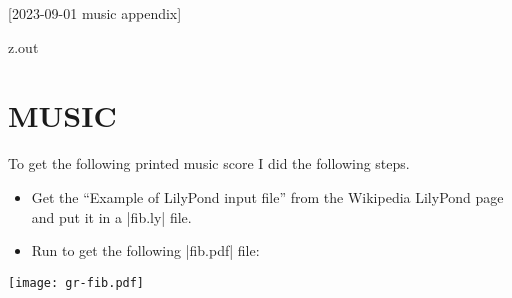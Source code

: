 [2023-09-01 music appendix]

\begin{VerbatimOut}{z.out}
\chapter{MUSIC}

To get the following printed music score I did the following steps.
\begin{itemize}
  \item
    Get the ``Example of LilyPond input file''
    from the Wikipedia LilyPond page
    \cite{wikipedia-lilypond}
    and put it in a
    |fib.ly|
    file.
  \item
    Run  to get the following
    |fib.pdf|
    file:
\end{itemize}

\noindent \texttt{[image: gr-fib.pdf]}
\end{VerbatimOut}

\MyIO
